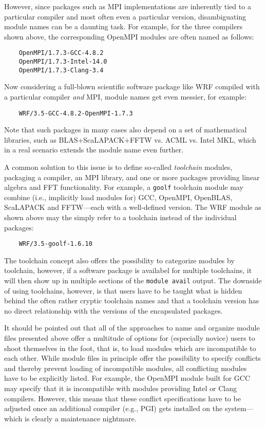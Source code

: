 However, since packages such as MPI implementations are inherently tied to a
particular compiler and most often even a particular version, disambiguating
module names can be a daunting task. For example, for the three compilers
shown above, the corresponding OpenMPI modules are often named as follows:
\begin{verbatim}
    OpenMPI/1.7.3-GCC-4.8.2
    OpenMPI/1.7.3-Intel-14.0
    OpenMPI/1.7.3-Clang-3.4
\end{verbatim}

Now considering a full-blown scientific software package like WRF compiled
with a particular compiler \emph{and} MPI, module names get even messier,
for example:
\begin{verbatim}
    WRF/3.5-GCC-4.8.2-OpenMPI-1.7.3
\end{verbatim}
Note that such packages in many cases also depend on a set of mathematical
libraries, such as BLAS+ScaLAPACK+FFTW vs. ACML vs. Intel MKL, which in a
real scenario extends the module name even further.

A common solution to this issue is to define so-called \emph{toolchain}
modules, packaging a compiler, an MPI library, and one or more packages
providing linear algebra and FFT functionality. For example, a \texttt{goolf}
toolchain module may combine (i.e., implicitly load modules for) GCC,
OpenMPI, OpenBLAS, ScaLAPACK and FFTW---each with a well-defined version. The
WRF module as shown above may the simply refer to a toolchain instead of the
individual packages:
\begin{verbatim}
    WRF/3.5-goolf-1.6.10
\end{verbatim}
The toolchain concept also offers the possibility to categorize modules by
toolchain, however, if a software package is availabel for multiple
toolchains, it will then show up in multiple sections of the \texttt{module
avail} output. The downside of using toolchains, however, is that users have
to be taught what is hidden behind the often rather cryptic toolchain names
and that a toolchain version has no direct relationship with the versions of
the encapsulated packages.

It should be pointed out that all of the approaches to name and organize
module files presented above offer a multitude of options for (especially
novice) users to shoot themselves in the foot, that is, to load modules which
are incompatible to each other. While module files in principle offer the
possibility to specify conflicts and thereby prevent loading of incompatible
modules, all conflicting modules have to be explicitly listed. For example,
the OpenMPI module built for GCC may specify that it is incompatible with
modules providing Intel or Clang compilers. However, this means that these
conflict specifications have to be adjusted once an additional compiler
(e.g., PGI) gets installed on the system---which is clearly a maintenance
nightmare.

